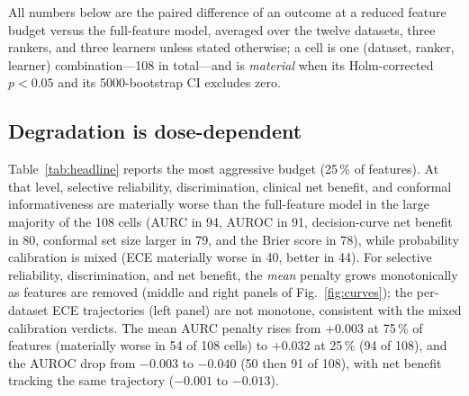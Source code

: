 \documentclass[fleqn,10pt]{wlscirep}
\newcommand{\result}[1]{#1}
\begin{document}
All numbers below are the paired difference of an outcome at a reduced feature budget versus
the full-feature model, averaged over the twelve datasets, three rankers, and three learners unless
stated otherwise; a cell is one (dataset, ranker, learner) combination---\result{108} in total---and
is \emph{material} when its Holm-corrected $p<0.05$ and its 5000-bootstrap CI excludes zero.

\subsection{Degradation is dose-dependent}
Table~\ref{tab:headline} reports the most aggressive budget (25\,\% of features). At that level,
selective reliability, discrimination, clinical net benefit, and conformal informativeness are
materially worse than the full-feature model in the large majority of the \result{108} cells (AURC in
\result{94}, AUROC in \result{91}, decision-curve net benefit in \result{80}, conformal set size
larger in \result{79}, and the Brier score in \result{78}), while probability calibration is
mixed (ECE materially worse in \result{40}, better in \result{44}). For selective reliability,
discrimination, and net benefit, the \emph{mean} penalty grows monotonically as features are removed
(middle and right panels of Fig.~\ref{fig:curves}); the per-dataset ECE trajectories (left panel) are
not monotone, consistent with the mixed calibration verdicts. The mean AURC penalty rises from \result{$+0.003$} at
75\,\% of features (materially worse in \result{54} of \result{108} cells) to \result{$+0.032$} at
25\,\% (\result{94} of \result{108}), and the AUROC drop from \result{$-0.003$} to \result{$-0.040$}
(\result{50} then \result{91} of \result{108}), with net benefit tracking the same trajectory
(\result{$-0.001$} to \result{$-0.013$}).

\begin{table}[t]
\centering
\caption{Paired difference at 25\,\% of features versus the full-feature model (mean over the
twelve datasets, three rankers, and three learners; positive ECE/Brier/AURC/gap values indicate
degradation, positive AUROC/net-benefit values indicate improvement). The two right columns split the
Holm-significant cells
(bootstrap CI excluding zero) by the direction of the difference into materially \emph{worse} and
materially \emph{better}; for the subgroup gaps, a widening counts as worse. Computed from the released
per-configuration result summary.}
\label{tab:headline}

\end{table}
\end{document}
